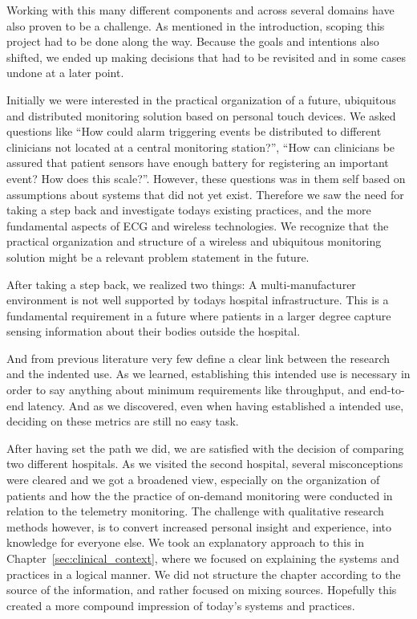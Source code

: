 Working with this many different components and across several domains have also proven to be a challenge. As mentioned in the introduction, scoping this project had to be done along the way. Because the goals and intentions also shifted, we ended up making decisions that had to be revisited and in some cases undone at a later point.

Initially we were interested in the practical organization of a future, ubiquitous and distributed monitoring solution based on personal touch devices. We asked questions like ``How could alarm triggering events be distributed to different clinicians not located at a central monitoring station?'', ``How can clinicians be assured that patient sensors have enough battery for registering an important event? How does this scale?''. However, these questions was in them self based on assumptions about systems that did not yet exist. Therefore we saw the need for taking a step back and investigate todays existing practices, and the more fundamental aspects of ECG and wireless technologies. We recognize that the practical organization and structure of a wireless and ubiquitous monitoring solution might be a relevant problem statement in the future.

After taking a step back, we realized two things: A multi-manufacturer environment is not well supported by todays hospital infrastructure. This is a fundamental requirement in a future where patients in a larger degree capture sensing information about their bodies outside the hospital. 

And from previous literature very few define a clear link between the research and the indented use. As we learned, establishing this intended use is necessary in order to say anything about minimum requirements like throughput, and end-to-end latency. And as we discovered, even when having established a intended use, deciding on these metrics are still no easy task.

After having set the path we did, we are satisfied with the decision of comparing two different hospitals. As we visited the second hospital, several misconceptions were cleared and we got a broadened view, especially on the organization of patients and how the the practice of on-demand monitoring were conducted in relation to the telemetry monitoring. The challenge with qualitative research methods however, is to convert increased personal insight and experience, into knowledge for everyone else. We took an explanatory approach to this in Chapter~\ref{sec:clinical_context}, where we focused on explaining the systems and practices in a logical manner. We did not structure the chapter according to the source of the information, and rather focused on mixing sources. Hopefully this created a more compound impression of today's systems and practices.

